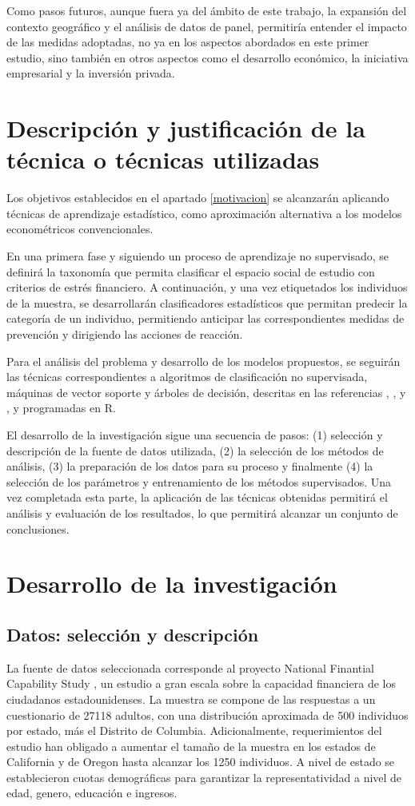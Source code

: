 \documentclass[a4paper, 11pt, bibliography=numbered, es]{article}
\begin{document}
Como pasos futuros, aunque fuera ya del ámbito de este trabajo, la expansión del contexto geográfico
y el análisis de datos de panel, permitiría entender el impacto de las medidas adoptadas, no ya en los
aspectos abordados en este primer estudio, sino también en otros aspectos como el desarrollo económico,
la iniciativa empresarial y la inversión privada. 

\section{Descripción y justificación de la técnica o técnicas utilizadas}
Los objetivos establecidos en el apartado \ref{motivacion} se alcanzarán aplicando técnicas de aprendizaje
estadístico, como aproximación alternativa a los modelos econométricos convencionales. 

En una primera fase y siguiendo un proceso de aprendizaje no supervisado, se definirá la taxonomía que permita
clasificar el espacio social de estudio con criterios de estrés financiero. A continuación, y una vez etiquetados
los individuos de la muestra, se desarrollarán clasificadores estadísticos que permitan predecir la categoría de un 
individuo, permitiendo anticipar las correspondientes medidas de prevención y dirigiendo las acciones de reacción. 

Para el análisis del problema y desarrollo de los modelos propuestos, se seguirán las técnicas correspondientes
a algoritmos de clasificación no supervisada, máquinas de vector soporte y árboles de decisión, descritas en las
referencias \cite{lantz23}, \cite{Hastie23}, \cite{aurelien17} y \cite{Hastie13}, y programadas en R\cite{R24}.

El desarrollo de la investigación sigue una secuencia de pasos: (1) selección y descripción de la fuente de datos utilizada,
(2) la selección de los métodos de análisis, (3) la preparación de los datos para su proceso y finalmente (4) la selección
de los parámetros y entrenamiento de los métodos supervisados. Una vez completada esta parte, la aplicación de
las técnicas obtenidas permitirá el análisis y evaluación de los resultados, lo que permitirá alcanzar un conjunto
de conclusiones.

\section{Desarrollo de la investigación}
\subsection{Datos: selección y descripción}
La fuente de datos seleccionada corresponde al proyecto National Finantial Capability Study \cite{NFCS01}, 
un estudio a gran escala sobre la capacidad financiera de los ciudadanos estadounidenses. La muestra se 
compone de las respuestas a un cuestionario de 27118 adultos, con una distribución aproximada de 500
individuos por estado, más el Distrito de Columbia. Adicionalmente, requerimientos del estudio han obligado
a aumentar el tamaño de la muestra en los estados de California y de Oregon hasta alcanzar los 1250 individuos.
A nivel de estado se establecieron cuotas demográficas para garantizar la representatividad a nivel de edad,
genero, educación e ingresos.
\end{document}
